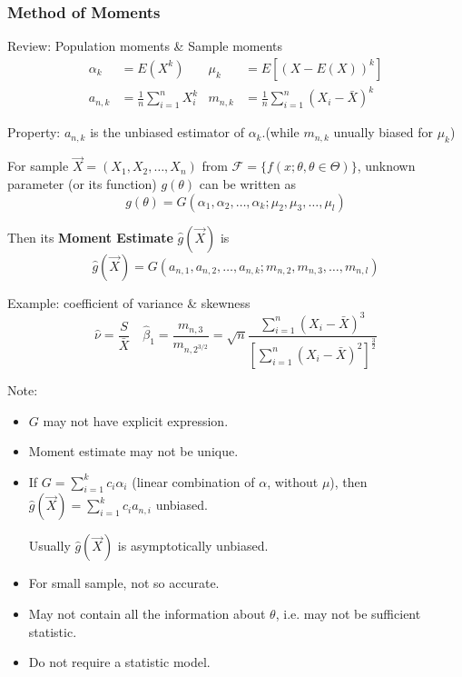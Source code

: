 \subsubsection{Method of Moments}\label{SubSectionMoM}
    Review: Population moments \& Sample moments
    \begin{align*}
        \alpha_k&=E(X^k)&\mu_k&=E[(X-E(X))^k]\\
        a_{n,k}&=\frac{1}{n}\sum_{i=1}^nX_i^k&m_{n,k}&=\frac{1}{n}\sum_{i=1}^n(X_i-\bar{X})^k
    \end{align*}

    Property: $a_{n,k}$ is the unbiased estimator of $\alpha_k$.(while $m_{n,k}$ unually biased for $\mu_k$)

    For sample $\vec{X}=(X_1,X_2,\ldots,X_n)$ from $\mathscr{F}=\{f(x;\theta,\theta\in\Theta)\}$, unknown parameter (or its function) $g(\theta)$ can be written as
    \[
        g(\theta)=G(\alpha_1,\alpha_2,\ldots,\alpha_k;\mu_2,\mu_3,\ldots,\mu_l)    
    \]

    Then its \textbf{Moment Estimate} $\hat{g}(\vec{X})$ is
\[
    \hat{g}(\vec{X})=G(a_{n,1},a_{n,2},\ldots,a_{n,k};m_{n,2},m_{n,3},\ldots,m_{n,l}) 
\]

    Example: coefficient of variance \& skewness 
    \[\hat{\nu}=\dfrac{S}{\bar{X}}\quad\hat{\beta}_1=\dfrac{m_{n,3}}{m_{n,2^{3/2}}}=\sqrt{n}{\displaystyle\frac{\displaystyle{\sum_{i=1}^n(X_i-\bar{X})^3}}{\displaystyle{[\sum_{i=1}^n(X_i-\bar{X})^2]^{\frac{3}{2}}}  }}\]

    \begin{point}
        Note:
    \end{point}
    
        
    \begin{itemize}
        \item $G$ may not have explicit expression.
        \item Moment estimate may not be unique.
        \item If $G={\displaystyle\sum_{i=1}^kc_i\alpha_i}$ (linear combination of $\alpha$, without $\mu$), then $\hat{g}(\vec{X})={\displaystyle\sum_{i=1}^kc_ia_{n,i}}$ unbiased.
        
        \qquad Usually $\hat{g}(\vec{X})$ is asymptotically unbiased.
        \item For small sample, not so accurate.
        \item May not contain all the information about $\theta$, i.e. may not be sufficient statistic.
        \item Do not require a statistic model.
    \end{itemize}


